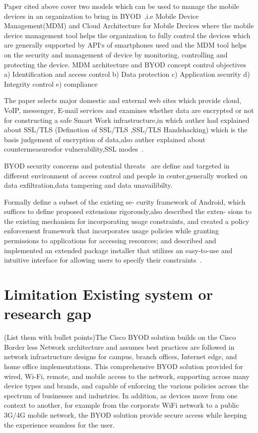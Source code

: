 \par Paper cited above cover two models which can be used to manage the mobile devices in an organization to bring in BYOD~\cite{pra},i.e Mobile Device Management(MDM) and Cloud Architecture for Mobile Devices where the mobile device management tool helps the organization to fully control the devices which are generally supported by API`s of smartphones used and the MDM tool helps on the security and management of device by monitoring, controlling and protecting the device.
MDM architecture and BYOD concept control objectives
a) Identification and access control
b) Data protection
c) Application security
d) Integrity control
e) compliance

\par The paper selects major domestic and external web sites which provide cloud, VoIP, messenger, E-mail services and examines whether data are encrypted or not for constructing a safe Smart Work infrastructure,in which auther had explained about SSL/TLS (Definotion of SSL/TLS
,SSL/TLS Handshacking) which is the basis judgement of encryption of data,also auther explained about countermeasuresfor vulnerability,SSL modes~\cite{dae}.

\par BYOD security concerns and potential threats~\cite{den,ant} are define and targeted in different environment of access control and people in center,generally worked on data exfiltration,data tampering and data unavailibilty.

\par Formally define a subset of the existing se-
curity framework of Android, which suffices to define proposed extensions rigorously,also described the exten-
sions to the existing mechanism for incorporating usage constraints, and created a policy enforcement framework that incorporates usage policies while granting permissions to applications for accessing resources; and described and implemented an extended package installer that utilizes an easy-to-use and intuitive interface for allowing users to specify their constraints~\cite{apex}.


\section{Limitation Existing system or research gap}
\par (List them with  bullet points)The Cisco BYOD solution builds on the Cisco Border less Network architecture and assumes best practices are followed in network infrastructure designs for campus, branch offices, Internet edge, and home office implementations.
This comprehensive BYOD solution provided for wired, Wi-Fi, remote, and mobile access to the network, supporting across many device types and brands, and capable of enforcing the various policies across the spectrum of businesses and industries.
In addition, as devices move from one context to another, for example from the corporate WiFi network to a public 3G/4G mobile network, the BYOD solution provide secure access while keeping the experience seamless for the user.

